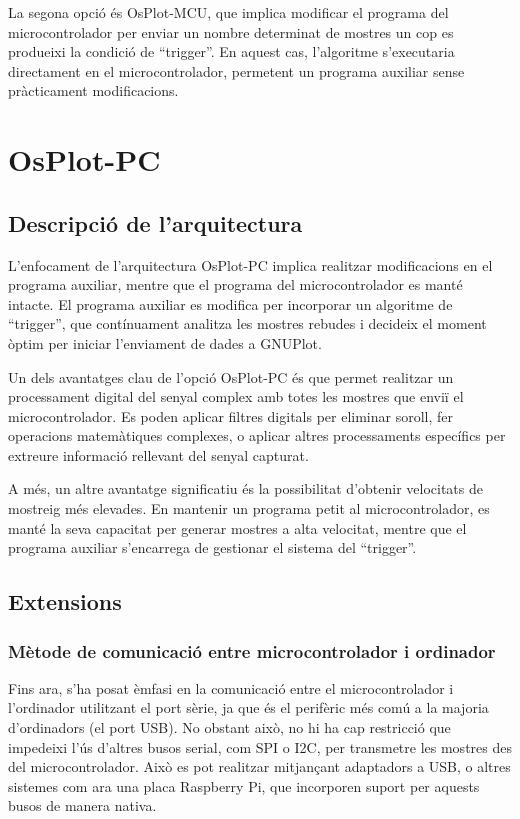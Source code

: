 \documentclass{tfgitic}[2023/06/30]
\begin{document}
La segona opció és OsPlot-MCU, que implica modificar el programa del
microcontrolador per enviar un nombre determinat de mostres un cop es
produeixi la condició de ``trigger''. En aquest cas, l'algoritme
s'executaria directament en el microcontrolador, permetent un programa
auxiliar sense pràcticament modificacions.

\section{OsPlot-PC}

\subsection{Descripció de l'arquitectura}

L'enfocament de l'arquitectura OsPlot-PC implica realitzar
modificacions en el programa auxiliar, mentre que el programa del
microcontrolador es manté intacte. El programa auxiliar es modifica
per incorporar un algoritme de ``trigger'', que contínuament analitza
les mostres rebudes i decideix el moment òptim per iniciar l'enviament
de dades a GNUPlot.

Un dels avantatges clau de l'opció OsPlot-PC és que permet realitzar
un processament digital del
senyal complex amb totes les mostres que enviï el microcontrolador. Es
poden aplicar filtres digitals per eliminar soroll, fer operacions
matemàtiques complexes, o aplicar altres processaments específics per
extreure informació rellevant del senyal capturat.

A més, un altre avantatge significatiu és la possibilitat d'obtenir
velocitats de mostreig més elevades. En mantenir un programa petit al
microcontrolador, es manté la seva capacitat per generar mostres a
alta velocitat, mentre que el programa auxiliar s'encarrega de
gestionar el sistema del ``trigger''.

\subsection{Extensions}
\label{subsec:extensions-osplot-pc}

\subsubsection{Mètode de comunicació entre microcontrolador i ordinador}

Fins ara, s'ha posat èmfasi en la comunicació entre el
microcontrolador i l'ordinador utilitzant el port sèrie, ja que és el
perifèric més comú a la majoria d'ordinadors (el port USB). No obstant
això, no hi ha cap restricció que impedeixi l'ús d'altres busos
serial, com SPI o I2C, per transmetre les mostres des del
microcontrolador. Això es pot realitzar mitjançant adaptadors a USB, o
altres sistemes com ara una placa Raspberry Pi, que incorporen suport
per aquests busos de manera nativa.
\end{document}
